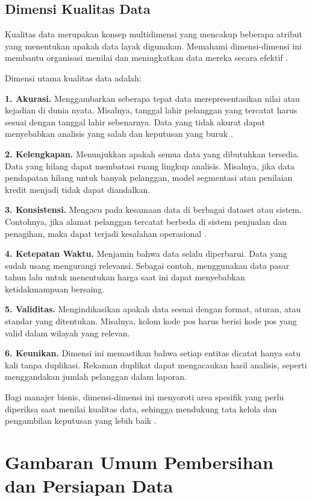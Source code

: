 \subsection{Dimensi Kualitas Data}

Kualitas data merupakan konsep multidimensi yang mencakup beberapa atribut yang menentukan apakah data layak digunakan. Memahami dimensi-dimensi ini membantu organisasi menilai dan meningkatkan data mereka secara efektif \cite{lee2006data}.

Dimensi utama kualitas data adalah:

\textbf{1. Akurasi.} Menggambarkan seberapa tepat data merepresentasikan nilai atau kejadian di dunia nyata. Misalnya, tanggal lahir pelanggan yang tercatat harus sesuai dengan tanggal lahir sebenarnya. Data yang tidak akurat dapat menyebabkan analisis yang salah dan keputusan yang buruk \cite{batini2009methodologies}.

\textbf{2. Kelengkapan.} Menunjukkan apakah semua data yang dibutuhkan tersedia. Data yang hilang dapat membatasi ruang lingkup analisis. Misalnya, jika data pendapatan hilang untuk banyak pelanggan, model segmentasi atau penilaian kredit menjadi tidak dapat diandalkan.

\textbf{3. Konsistensi.} Mengacu pada kesamaan data di berbagai dataset atau sistem. Contohnya, jika alamat pelanggan tercatat berbeda di sistem penjualan dan penagihan, maka dapat terjadi kesalahan operasional \cite{madnick2009overview}.

\textbf{4. Ketepatan Waktu.} Menjamin bahwa data selalu diperbarui. Data yang sudah usang mengurangi relevansi. Sebagai contoh, menggunakan data pasar tahun lalu untuk menentukan harga saat ini dapat menyebabkan ketidakmampuan bersaing.

\textbf{5. Validitas.} Mengindikasikan apakah data sesuai dengan format, aturan, atau standar yang ditentukan. Misalnya, kolom kode pos harus berisi kode pos yang valid dalam wilayah yang relevan.

\textbf{6. Keunikan.} Dimensi ini memastikan bahwa setiap entitas dicatat hanya satu kali tanpa duplikasi. Rekaman duplikat dapat mengacaukan hasil analisis, seperti menggandakan jumlah pelanggan dalam laporan.

Bagi manajer bisnis, dimensi-dimensi ini menyoroti area spesifik yang perlu diperiksa saat menilai kualitas data, sehingga mendukung tata kelola dan pengambilan keputusan yang lebih baik \cite{caballero2014quality}.

\section{Gambaran Umum Pembersihan dan Persiapan Data}

